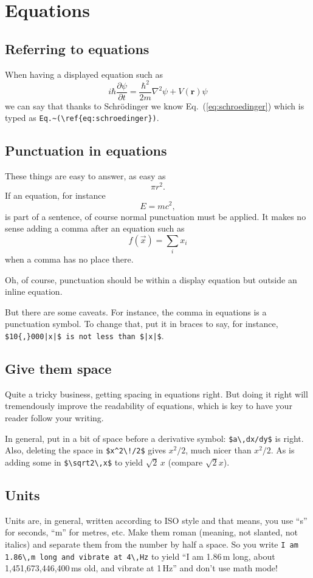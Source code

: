 \documentclass{article}
\begin{document}
\section{Equations}
\subsection{Referring to equations}\label{sec:refereq}
When having a displayed equation such as
\begin{equation}\label{eq:schroedinger}
i\hbar\frac{\partial\psi}{\partial t} = \frac{\hbar^2}{2m}\nabla^2\psi + V(\mathbf{r})\psi
\end{equation}
we can say that thanks to Schr\"odinger we know Eq.~(\ref{eq:schroedinger}) which
is typed as \verb+Eq.~(\ref{eq:schroedinger})+.

\subsection{Punctuation in equations}

These things are easy to answer, as easy as
$$ \pi r^2.$$
If an equation, for instance
$$ E = m c^2, $$
is part of a sentence, of course normal punctuation must be applied.  It makes no sense adding a comma after an equation such as 
$$ f(\vec x) = \sum_i x_i $$
when a comma has no place there.

Oh, of course, punctuation should be within a display equation but outside an inline equation.

But there are some caveats.  For instance, the comma in equations is a punctuation symbol.
To change that, put it in braces to say, for instance, \verb+$10{,}000|x|$ is not less than $|x|$+.

\subsection{Give them space}
Quite a tricky business, getting spacing in equations right.  But doing it right will tremendously
improve the readability of equations, which is key to have your reader follow your writing.

In general, put in a bit of space before a derivative symbol: \verb+$a\,dx/dy$+ is right.
Also, deleting the space in \verb+$x^2\!/2$+ gives $x^2\!/2$, much nicer than $x^2/2$.
As is adding some in \verb+$\sqrt2\,x$+ to yield $\sqrt2\,x$ (compare $\sqrt2x$).

\subsection{Units}
Units are, in general, written according to ISO style and that means, you use ``s'' for seconds, ``m'' for metres, etc.  Make them roman (meaning, not slanted, not italics) and separate them from the number by half a space.  So you write \verb+I am 1.86\,m long and vibrate at 4\,Hz+ to yield ``I am 1.86\,m long, about 1,451,673,446,400\,ms old, and vibrate at 1\,Hz'' and don't use math mode!  
\end{document}
